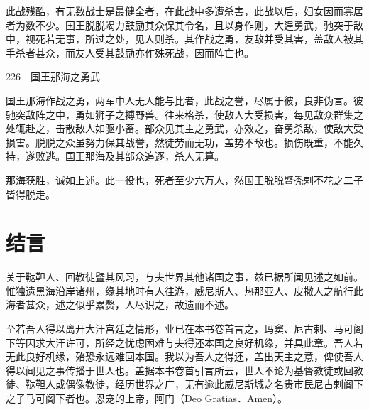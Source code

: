 \documentclass[12pt,UTF8]{ctexbook}
\begin{document}
此战残酷，有无数战士是最健全者，在此战中多遭杀害，此战以后，妇女因而寡居者为数不少。国王脱脱竭力鼓励其众保其令名，且以身作则，大逞勇武，驰突于敌中，视死若无事，所过之处，见人则杀。其作战之勇，友敌并受其害，盖敌人被其手杀者甚众，而友人受其鼓励亦作殊死战，因而阵亡也。





226　国王那海之勇武

国王那海作战之勇，两军中人无人能与比者，此战之誉，尽属于彼，良非伪言。彼驰突敌阵之中，勇如狮子之搏野兽。往来格杀，使敌人大受损害，每见敌众群集之处辄赴之，击散敌人如驱小畜。部众见其主之勇武，亦效之，奋勇杀敌，使敌大受损害。脱脱之众虽努力保其战誉，然徒劳而无功，盖势不敌也。损伤既重，不能久持，遂败逃。国王那海及其部众追逐，杀人无算。

那海获胜，诚如上述。此一役也，死者至少六万人，然国王脱脱暨秃剌不花之二子皆得脱走。

\chapter{结言}

关于鞑靼人、回教徒暨其风习，与夫世界其他诸国之事，兹已据所闻见述之如前。惟独遗黑海沿岸诸州，缘其地时有人往游，威尼斯人、热那亚人、皮撒人之航行此海者甚众，述之似乎累赘，人尽识之，故遗而不述。

至若吾人得以离开大汗宫廷之情形，业已在本书卷首言之，玛窦、尼古剌、马可阁下等因求大汗许可，所经之忧虑困难与夫得还本国之良好机缘，并具此章。吾人若无此良好机缘，殆恐永远难回本国。我以为吾人之得还，盖出天主之意，俾使吾人得以闻见之事传播于世人也。盖据本书卷首引言所云，世人不论为基督教徒或回教徒、鞑靼人或偶像教徒，经历世界之广，无有逾此威尼斯城之名贵市民尼古剌阁下之子马可阁下者也。恩宠的上帝，阿门（Deo Gratias．Amen）。

\backmatter
\end{document}
